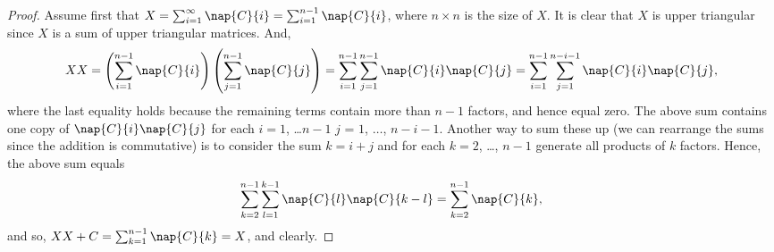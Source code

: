  \begin{proof}
   Assume first that $X = \sum_{i = 1}^\infty \nap{C}{i}= \sum_{i = 1}^{n-1}\nap{C}{i}$, where $n \times n$ is the size of $X$. It is clear that $X$ is upper triangular since $X$ is a sum of upper triangular matrices. And, 
   \begin{equation*}
     X X = 
     \left(\sum_{i = 1}^{n-1}\nap{C}{i}\right)\left(\sum_{j = 1}^{n-1}\nap{C}{j}\right) =
     \sum_{i = 1}^{n - 1}\sum_{j = 1}^{n-1}\nap{C}{i}\nap{C}{j} = 
     \sum_{i = 1}^{n - 1}\sum_{j = 1}^{n - i - 1}\nap{C}{i}\nap{C}{j},
   \end{equation*}
   where the last equality holds because the remaining terms contain more than $n-1$ factors, and hence equal zero.
   The above sum contains one copy of $\nap{C}{i}\nap{C}{j}$ for each $i = 1$, \ldots $n-1$ $j$ = $1$, $\ldots$, $n - i -1$. 
   Another way to sum these up (we can rearrange the sums since the addition is commutative) is to consider the sum $k = i + j$ and for each $k = 2$, \ldots, $n-1$ generate all products of $k$ factors. Hence, the above sum equals
   \begin{equation*}
     \sum_{k = 2}^{n-1}\sum_{l = 1}^{k-1}\nap{C}{l}\nap{C}{k-l} = \sum_{k = 2}^{n-1}\nap{C}{k},
   \end{equation*}
   and so, $XX + C = \sum_{k = 1}^{n-1}\nap{C}{k} = X$, and clearly.


\end{proof}
